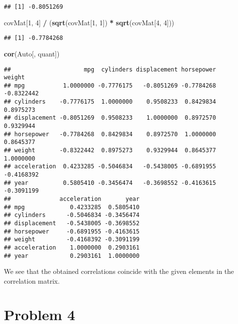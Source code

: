 \documentclass[
]{article}
\newenvironment{Shaded}{\begin{snugshade}}{\end{snugshade}}
\newcommand{\DecValTok}[1]{\textcolor[rgb]{0.00,0.00,0.81}{#1}}
\newcommand{\FunctionTok}[1]{\textcolor[rgb]{0.13,0.29,0.53}{\textbf{#1}}}
\newcommand{\NormalTok}[1]{#1}
\newcommand{\SpecialCharTok}[1]{\textcolor[rgb]{0.81,0.36,0.00}{\textbf{#1}}}
\begin{document}
\begin{verbatim}
## [1] -0.8051269
\end{verbatim}

\begin{Shaded}
\begin{Highlighting}[]
\NormalTok{covMat[}\DecValTok{1}\NormalTok{, }\DecValTok{4}\NormalTok{] }\SpecialCharTok{/}\NormalTok{ (}\FunctionTok{sqrt}\NormalTok{(covMat[}\DecValTok{1}\NormalTok{, }\DecValTok{1}\NormalTok{]) }\SpecialCharTok{*} \FunctionTok{sqrt}\NormalTok{(covMat[}\DecValTok{4}\NormalTok{, }\DecValTok{4}\NormalTok{]))}
\end{Highlighting}
\end{Shaded}

\begin{verbatim}
## [1] -0.7784268
\end{verbatim}

\begin{Shaded}
\begin{Highlighting}[]
\FunctionTok{cor}\NormalTok{(Auto[, quant])}
\end{Highlighting}
\end{Shaded}

\begin{verbatim}
##                     mpg  cylinders displacement horsepower     weight
## mpg           1.0000000 -0.7776175   -0.8051269 -0.7784268 -0.8322442
## cylinders    -0.7776175  1.0000000    0.9508233  0.8429834  0.8975273
## displacement -0.8051269  0.9508233    1.0000000  0.8972570  0.9329944
## horsepower   -0.7784268  0.8429834    0.8972570  1.0000000  0.8645377
## weight       -0.8322442  0.8975273    0.9329944  0.8645377  1.0000000
## acceleration  0.4233285 -0.5046834   -0.5438005 -0.6891955 -0.4168392
## year          0.5805410 -0.3456474   -0.3698552 -0.4163615 -0.3091199
##              acceleration       year
## mpg             0.4233285  0.5805410
## cylinders      -0.5046834 -0.3456474
## displacement   -0.5438005 -0.3698552
## horsepower     -0.6891955 -0.4163615
## weight         -0.4168392 -0.3091199
## acceleration    1.0000000  0.2903161
## year            0.2903161  1.0000000
\end{verbatim}

We see that the obtained correlations coincide with the given elements
in the correlation matrix.

\section{Problem 4}\label{problem-4}
\end{document}
